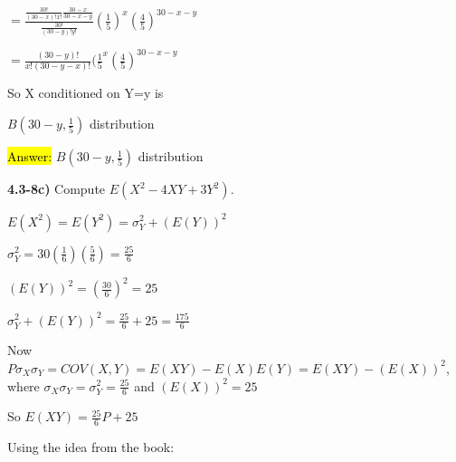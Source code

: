 \documentclass{article}
\begin{document}
\vspace{2mm}

$=\frac{\frac{30!}{(30-x)!x!} \frac{30-x}{30-x-y}}{\frac{30!}{(30-y)!y!}} (\frac{1}{5})^{x}(\frac{4}{5})^{30-x-y}$

\vspace{2mm}


$=\frac{(30-y)!}{x!(30-y-x)!} (\frac{1}{5}^{x}(\frac{4}{5})^{30-x-y}$

\vspace{4mm}

So X conditioned on Y=y is 

\vspace{2mm}

$B(30-y, \frac{1}{5})$ distribution

\vspace{2mm}

\hl{Answer:} $B(30-y, \frac{1}{5})$ distribution



\vspace{5mm}


\textbf{4.3-8c)} Compute $E(X^{2}-4XY+3Y^{2})$.

\vspace{2mm}

$E(X^{2})=E(Y^{2})=\sigma^{2}_{Y}+(E(Y))^{2}$

\vspace{2mm}

$\sigma^{2}_{Y}=30(\frac{1}{6})(\frac{5}{6})=\frac{25}{6}$

\vspace{2mm}


$(E(Y))^{2}=(\frac{30}{6})^{2}=25$

\vspace{2mm}


$\sigma^{2}_{Y}+(E(Y))^{2}=\frac{25}{6}+25=\frac{175}{6}$

\vspace{2mm}

Now $P\sigma_{X}\sigma_{Y}=COV(X,Y)= E(XY)-E(X)E(Y)=E(XY)-(E(X))^{2}$, where $\sigma_{X}\sigma_{Y}=\sigma_{Y}^{2}=\frac{25}{6}$ and $(E(X))^{2}=25$

\vspace{2mm}

So $E(XY)=\frac{25}{6}P+25$

\vspace{2mm}



Using the idea from the book:
\end{document}
